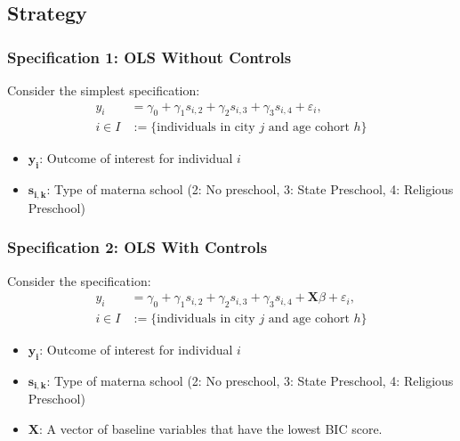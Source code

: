 \documentclass{beamer}
\begin{document}
\subsection{Strategy}\label{sec:strategy}
\begin{frame} \frametitle{Specification 1: OLS Without Controls}
Consider the simplest specification:
\begin{align*} \label{OLS-nocontrol}
	y_{i} & = \gamma_0 + \gamma_1 s_{i,2} + \gamma_2 s_{i,3} + \gamma_3 s_{i,4} +\varepsilon_{i}, \\
	 i \in I & := \{ \text{individuals in city $j$ and age cohort $h$}\}
\end{align*}
\begin{itemize}
\item $\mathbf{y_{i}}$: Outcome of interest for individual $i$
\item $\mathbf{s_{i,k}}$: Type of materna school (2: No preschool, 3: State Preschool, 4: Religious Preschool)
\end{itemize}

\end{frame}


\begin{frame} \frametitle{Specification 2: OLS With Controls}
Consider the specification:
\begin{align*}
	y_{i} & = \gamma_0 + \gamma_1 s_{i,2} + \gamma_2 s_{i,3} + \gamma_3 s_{i,4} + \mathbf{X}\beta +\varepsilon_{i}, \\
	 i \in I & := \{ \text{individuals in city $j$ and age cohort $h$}\}
\end{align*}
\begin{itemize}
\item $\mathbf{y_{i}}$: Outcome of interest for individual $i$
\item $\mathbf{s_{i,k}}$: Type of materna school (2: No preschool, 3: State Preschool, 4: Religious Preschool)
\item $\mathbf{X}$: A vector of baseline variables that have the lowest BIC score.
\end{itemize}

\end{frame}
\end{document}
